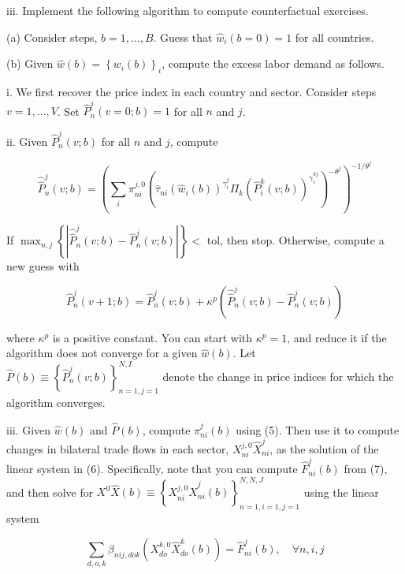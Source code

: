 \documentclass[12pt,oneside,reqno]{article}
\begin{document}
\begin{enumerate}[label=\roman*., leftmargin=*]
iii. Implement the following algorithm to compute counterfactual exercises.

(a) Consider steps, $b=1, \ldots, B$. Guess that $\hat{w}_{i}(b=0)=1$ for all countries.

(b) Given $\hat{w}(b)=\left\{w_{i}(b)\right\}_{i}$, compute the excess labor demand as follows.

i. We first recover the price index in each country and sector. Consider steps $v=1, \ldots, V$. Set $\hat{P}_{n}^{j}(v=0 ; b)=1$ for all $n$ and $j$.

ii. Given $\hat{P}_{n}^{j}(v ; b)$ for all $n$ and $j$, compute

\begin{equation*}
\hat{\hat{P}}_{n}^{j}(v ; b)=\left(\sum_{i} \pi_{n i}^{j, 0}\left(\hat{\tau}_{n i}\left(\hat{w}_{i}(b)\right)^{\gamma_{i}^{j}} \Pi_{k}\left(\hat{P}_{i}^{k}(v ; b)\right)^{\gamma_{i}^{k j}}\right)^{-\theta^{j}}\right)^{-1 / \theta^{j}}
\end{equation*}

If $\max _{n, j}\left\{\left|\hat{\hat{P}}_{n}^{j}(v ; b)-\hat{P}_{n}^{j}(v ; b)\right|\right\}<$ tol, then stop. Otherwise, compute a new guess with

\begin{equation*}
\hat{P}_{n}^{j}(v+1 ; b)=\hat{P}_{n}^{j}(v ; b)+\kappa^{p}\left(\hat{\hat{P}}_{n}^{j}(v ; b)-\hat{P}_{n}^{j}(v ; b)\right)
\end{equation*}

where $\kappa^{p}$ is a positive constant. You can start with $\kappa^{p}=1$, and reduce it if the algorithm does not converge for a given $\hat{w}(b)$. Let $\hat{P}(b) \equiv\left\{\hat{P}_{n}^{j}(v ; b)\right\}_{n=1, j=1}^{N, I}$ denote the change in price indices for which the algorithm converges.

iii. Given $\hat{w}(b)$ and $\hat{P}(b)$, compute $\hat{\pi}_{n i}^{j}(b)$ using (5). Then use it to compute changes in bilateral trade flows in each sector, $X_{n i}^{j, 0} \hat{X}_{n i}^{j}$, as the solution of the linear system in (6). Specifically, note that you can compute $\hat{F}_{n i}^{j}(b)$ from (7), and then solve for $X^{0} \hat{X}(b) \equiv\left\{X_{n i}^{j, 0} \hat{X}_{n i}^{j}(b)\right\}_{n=1, i=1, j=1}^{N, N, J}$ using the linear system

\begin{equation*}
\sum_{d, o, k} \beta_{n i j, d o k}\left(X_{d o}^{k, 0} \hat{X}_{d o}^{k}(b)\right)=\hat{F}_{n i}^{j}(b), \quad \forall n, i, j
\end{equation*}


\end{enumerate}
\end{document}
